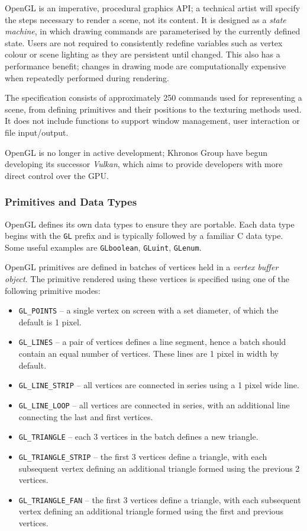 \documentclass[12pt,twoside]{report}
\begin{document}
OpenGL is an imperative, procedural graphics API; a technical artist will specify the steps necessary to render a scene, not its content. It is designed as a \textit{state machine}, in which drawing commands are parameterised by the currently defined state. Users are not required to consistently redefine variables such as vertex colour or scene lighting as they are persistent until changed. This also has a performance benefit; changes in drawing mode are computationally expensive when repeatedly performed during rendering.

The specification consists of approximately 250 commands used for representing a scene, from defining primitives and their positions to the texturing methods used. It does not include functions to support window management, user interaction or file input/output.

OpenGL is no longer in active development; Khronos Group have begun developing its successor \textit{Vulkan}, which aims to provide developers with more direct control over the GPU.


\subsubsection{Primitives and Data Types}

OpenGL defines its own data types to ensure they are portable. Each data type begins with the \verb|GL| prefix and is typically followed by a familiar C data type. Some useful examples are \verb|GLboolean|, \verb|GLuint|, \verb|GLenum|.\autocite{jr_richard_s_wright_opengl_2010}\autocite{mark_segal_opengl_2022}

OpenGL primitives are defined in batches of vertices held in a \textit{vertex buffer object}. The primitive rendered using these vertices is specified using one of the following primitive modes:
\begin{itemize}
  \item \verb|GL_POINTS| -- a single vertex on screen with a set diameter, of which the default is 1 pixel.
  \item \verb|GL_LINES| -- a pair of vertices defines a line segment, hence a batch should contain an equal number of vertices. These lines are 1 pixel in width by default.
  \item \verb|GL_LINE_STRIP| -- all vertices are connected in series using a 1 pixel wide line.
  \item \verb|GL_LINE_LOOP| -- all vertices are connected in series, with an additional line connecting the last and first vertices.
  \item \verb|GL_TRIANGLE| -- each 3 vertices in the batch defines a new triangle.
  \item \verb|GL_TRIANGLE_STRIP| -- the first 3 vertices define a triangle, with each subsequent vertex defining an additional triangle formed using the previous 2 vertices.
  \item \verb|GL_TRIANGLE_FAN| -- the first 3 vertices define a triangle, with each subsequent vertex defining an additional triangle formed using the first and previous vertices.
\end{itemize}
\end{document}
